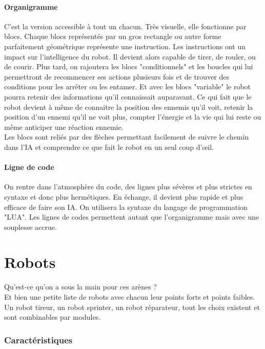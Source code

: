 \documentclass[10pt]{article}
\begin{document}
\subsection*{Organigramme}

C'est la version accessible à tout un chacun. Très visuelle, elle fonctionne par blocs. Chaque blocs représentés par un gros rectangle ou autre forme parfaitement géométrique représente une instruction. Les instructions ont un impact sur l'intelligence du robot. Il devient alors capable de tirer, de rouler, ou de courir. Plus tard, on rajoutera les blocs "conditionnels" et les boucles qui lui permettront de recommencer ses actions plusieurs fois et de trouver des conditions pour les arrêter ou les entamer. Et avec les blocs "variable" le robot pourra retenir des informations qu'il connaissait auparavant.
Ce qui fait que le robot devient à même de connaitre la position des ennemis qu'il voit, retenir la position d'un ennemi qu'il ne voit plus, compter l'énergie et la vie qui lui reste ou même anticiper une réaction ennemie.\\
Les blocs sont reliés par des flèches permettant facilement de suivre le chemin dans l'IA et comprendre ce que fait le robot en un seul coup d'œil.

\subsection*{Ligne de code}

On rentre dans l'atmosphère du code, des lignes plus sévères et plus strictes en syntaxe et donc plus hermétiques. En échange, il devient plus rapide et plus efficace de faire son IA. On utilisera la syntaxe du langage de programmation "LUA". Les lignes de codes permettent autant que l'organigramme mais avec une souplesse accrue.




\newpage
\setcounter{section}{0}
\part{Robots}

Qu'est-ce qu'on a sous la main pour ces arènes ?\\
Et bien une petite liste de robots avec chacun leur points forts et points faibles. Un robot tireur, un robot sprinter, un robot réparateur, tout les choix existent et sont combinables par modules.

\section{Caractéristiques}
\end{document}
